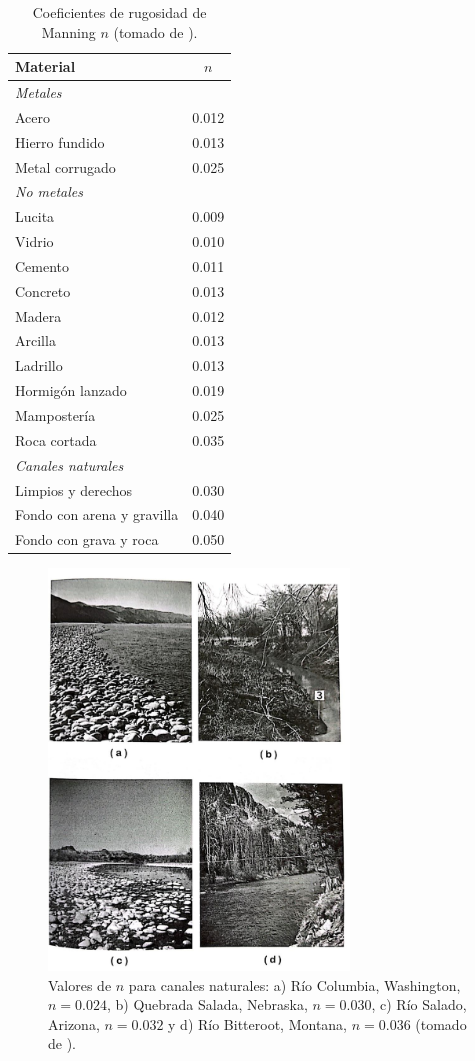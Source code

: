 \documentclass[11pt, oneside]{article}
\begin{document}
\begin{table}[h!]
\centering
\begin{tabular}{l c}
 \hline
  Material & $n$ \\ [0.5ex]
 \hline\hline
 \emph{Metales} & \\
 Acero & 0.012 \\
 Hierro fundido & 0.013 \\
 Metal corrugado & 0.025 \\
 \emph{No metales} & \\
 Lucita & 0.009 \\
 Vidrio & 0.010 \\
 Cemento & 0.011 \\
 Concreto & 0.013 \\
 Madera & 0.012 \\
 Arcilla & 0.013 \\
 Ladrillo & 0.013 \\
 Hormig\'on lanzado & 0.019 \\
 Mamposter\'ia & 0.025 \\
 Roca cortada & 0.035 \\
 \emph{Canales naturales} & \\
 Limpios y derechos & 0.030 \\
 Fondo con arena y gravilla & 0.040 \\
 Fondo con grava y roca & 0.050 \\
\hline
\end{tabular}
\caption{Coeficientes de rugosidad de Manning $n$ (tomado de \cite{VChow}).}
\label{ta1}
\end{table}

\begin{figure}[h]
\centering
\includegraphics[width=8cm]{fig441.jpeg}
\caption{Valores de $n$ para canales naturales: a) R\'io Columbia, Washington, $n=0.024$, b) Quebrada Salada, Nebraska, $n=0.030$, c) R\'io Salado, Arizona, $n=0.032$ y d) R\'io Bitteroot, Montana, $n=0.036$  (tomado de \cite{Chau}).}
\label{fig4}
\end{figure}
\end{document}
